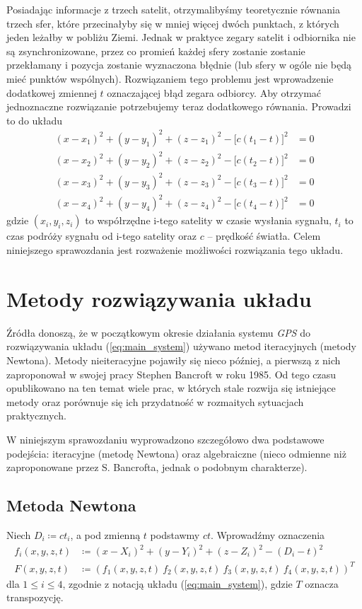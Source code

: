\documentclass{article}
\begin{document}
Posiadając informacje z trzech satelit, otrzymalibyśmy teoretycznie równania trzech sfer, które przecinałyby się w
mniej więcej dwóch punktach, z których jeden leżałby w pobliżu Ziemi. Jednak w praktyce zegary satelit i odbiornika
nie są zsynchronizowane, przez co promień każdej sfery zostanie zostanie przekłamany i pozycja zostanie wyznaczona błędnie
(lub sfery w ogóle nie będą mieć punktów wspólnych). Rozwiązaniem tego problemu jest wprowadzenie dodatkowej zmiennej $t$
oznaczającej błąd zegara odbiorcy. Aby otrzymać jednoznaczne rozwiązanie potrzebujemy teraz dodatkowego równania.
Prowadzi to do układu
\begin{equation} \label{eq:main_system}
\begin{aligned}
    (x-x_1)^2 + (y-y_1)^2 + (z-z_1)^2 - \big[c(t_1-t)\big]^2 &= 0 \\
    (x-x_2)^2 + (y-y_2)^2 + (z-z_2)^2 - \big[c(t_2-t)\big]^2 &= 0 \\
    (x-x_3)^2 + (y-y_3)^2 + (z-z_3)^2 - \big[c(t_3-t)\big]^2 &= 0 \\
    (x-x_4)^2 + (y-y_4)^2 + (z-z_4)^2 - \big[c(t_4-t)\big]^2 &= 0
\end{aligned}
\end{equation}
gdzie $(x_i, y_i, z_i)$ to współrzędne i-tego satelity w czasie wysłania sygnału, $t_i$ to czas podróży sygnału od
i-tego satelity oraz $c$ -- prędkość światła.
Celem niniejszego sprawozdania jest rozważenie możliwości rozwiązania tego układu.

\section{Metody rozwiązywania układu}
Źródła donoszą, że w początkowym okresie działania systemu \textit{GPS} do rozwiązywania układu (\ref{eq:main_system})
używano metod iteracyjnych (metody Newtona). Metody nieiteracyjne pojawiły się nieco później, a pierwszą z nich
zaproponował w swojej pracy Stephen Bancroft w roku 1985. Od tego czasu opublikowano na ten temat wiele prac, w których
stale rozwija się istniejące metody oraz porównuje się ich przydatność w rozmaitych sytuacjach praktycznych.

W niniejszym sprawozdaniu wyprowadzono szczegółowo dwa podstawowe podejścia: iteracyjne (metodę Newtona) oraz
algebraiczne (nieco odmienne niż zaproponowane przez S. Bancrofta, jednak o podobnym charakterze).

\subsection{Metoda Newtona} \label{newton}
Niech $D_i \coloneqq ct_i$, a pod zmienną $t$ podstawmy $ct$.
Wprowadźmy oznaczenia
\begin{align}
\label{eq:f} f_i(x, y, z, t) &\coloneqq (x-X_i)^2 + (y-Y_i)^2 + (z-Z_i)^2 - (D_i-t)^2 \\
\label{eq:F} F(x, y, z, t) &\coloneqq (f_1(x, y, z, t) \ f_2(x, y, z, t) \ f_3(x, y, z, t) \ f_4(x, y, z, t))^T
\end{align}
dla $1 \leq i \leq 4$, zgodnie z notacją układu (\ref{eq:main_system}), gdzie $T$ oznacza transpozycję.
\end{document}
